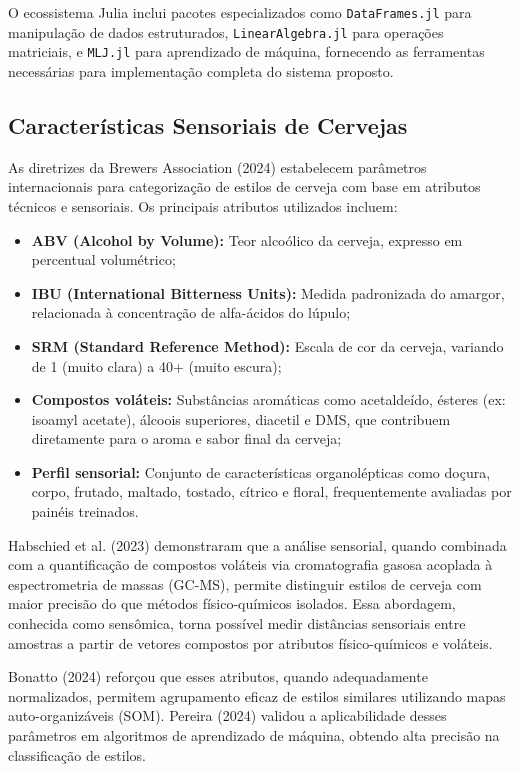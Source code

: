\documentclass[12pt,a4paper]{article}
\begin{document}
O ecossistema Julia inclui pacotes especializados como \texttt{DataFrames.jl} para manipulação de dados estruturados, \texttt{LinearAlgebra.jl} para operações matriciais, e \texttt{MLJ.jl} para aprendizado de máquina, fornecendo as ferramentas necessárias para implementação completa do sistema proposto.

\subsection{Características Sensoriais de Cervejas}

As diretrizes da Brewers Association (2024) estabelecem parâmetros internacionais para categorização de estilos de cerveja com base em atributos técnicos e sensoriais. Os principais atributos utilizados incluem:

\begin{itemize}
\item \textbf{ABV (Alcohol by Volume):} Teor alcoólico da cerveja, expresso em percentual volumétrico;
\item \textbf{IBU (International Bitterness Units):} Medida padronizada do amargor, relacionada à concentração de alfa-ácidos do lúpulo;
\item \textbf{SRM (Standard Reference Method):} Escala de cor da cerveja, variando de 1 (muito clara) a 40+ (muito escura);
\item \textbf{Compostos voláteis:} Substâncias aromáticas como acetaldeído, ésteres (ex: isoamyl acetate), álcoois superiores, diacetil e DMS, que contribuem diretamente para o aroma e sabor final da cerveja;
\item \textbf{Perfil sensorial:} Conjunto de características organolépticas como doçura, corpo, frutado, maltado, tostado, cítrico e floral, frequentemente avaliadas por painéis treinados.
\end{itemize}

Habschied et al. (2023) demonstraram que a análise sensorial, quando combinada com a quantificação de compostos voláteis via cromatografia gasosa acoplada à espectrometria de massas (GC-MS), permite distinguir estilos de cerveja com maior precisão do que métodos físico-químicos isolados. Essa abordagem, conhecida como sensômica, torna possível medir distâncias sensoriais entre amostras a partir de vetores compostos por atributos físico-químicos e voláteis.

Bonatto (2024) reforçou que esses atributos, quando adequadamente normalizados, permitem agrupamento eficaz de estilos similares utilizando mapas auto-organizáveis (SOM). Pereira (2024) validou a aplicabilidade desses parâmetros em algoritmos de aprendizado de máquina, obtendo alta precisão na classificação de estilos.
\end{document}
